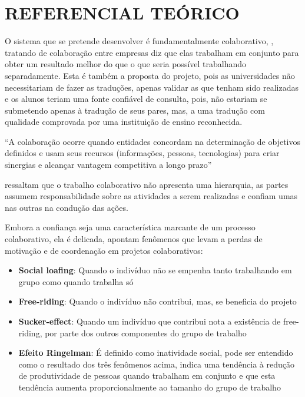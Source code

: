 
\chapter{REFERENCIAL TEÓRICO}
\label{chap:fundamentacaoTeorica}

O sistema que se pretende desenvolver é fundamentalmente colaborativo,  , tratando de colaboração entre empresas diz que elas trabalham em conjunto para obter um resultado melhor do que o que seria possível trabalhando separadamente. Esta é também a proposta do projeto, pois as universidades não necessitariam de fazer as traduções, apenas validar as que tenham sido realizadas e os alunos teriam uma fonte confiável de consulta, pois, não estariam se submetendo apenas à tradução de seus pares, mas, a uma tradução com qualidade comprovada por uma instituição de ensino reconhecida.

“A colaboração ocorre quando entidades concordam na determinação de objetivos definidos e usam seus recursos (informações, pessoas, tecnologias) para criar sinergias e alcançar vantagem competitiva a longo prazo” \cite{Alcantara2016}

 ressaltam que o trabalho colaborativo não apresenta uma hierarquia, as partes assumem responsabilidade sobre as atividades a serem realizadas e confiam umas nas outras na condução das ações.

Embora a confiança seja uma característica marcante de um processo colaborativo, ela é delicada,  apontam fenômenos que levam a perdas de motivação e de coordenação em projetos colaborativos:

\begin{itemize}
	\item \textbf{Social loafing}: Quando o indivíduo não se empenha tanto trabalhando em grupo como quando trabalha só
	\item \textbf{Free-riding}: Quando o indivíduo não contribui, mas, se beneficia do projeto 
	\item \textbf{Sucker-effect}: Quando um indivíduo que contribui nota a existência de free-riding, por parte dos outros componentes do grupo de trabalho
	\item \textbf{Efeito Ringelman}: É definido como inatividade social, pode ser entendido como o resultado dos três fenômenos acima, indica uma tendência à redução de produtividade de pessoas quando trabalham em conjunto e que esta tendência aumenta proporcionalmente ao tamanho do grupo de trabalho
\end{itemize}

